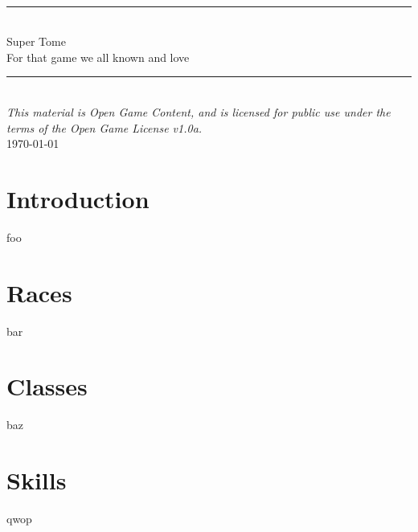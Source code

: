 \documentclass[12pt,twoside,onecolumn,openany,final]{memoir}
\begin{document}
\thispagestyle{empty}
\begin{center}
\textsc{\Large}\\[0.25cm]
\rule{\linewidth}{0.5mm} \\[0.70cm]
\fontsize{30}{30} \selectfont Super Tome\\[.30cm]
\fontsize{16}{18} \selectfont \guillemotleft{} For that game we all known and love \guillemotright{}\\
\rule{\linewidth}{0.5mm} \\[0.6cm]
\vfill
\footnotesize{\textit{This material is Open Game Content, and is licensed for public use under the terms of the Open Game License v1.0a.}}\\
\normalsize{\today}
\end{center}

\pagebreak
\sffamily
\pagestyle{plain}
\raggedbottom

\renewcommand{\contentsname}{Table of Contents}
\setcounter{tocdepth}{1}
\tableofcontents



\clearpage
\chapter{Introduction}
foo
\chapter{Races}
bar
\chapter{Classes}
baz
\chapter{Skills}
qwop
\end{document}

